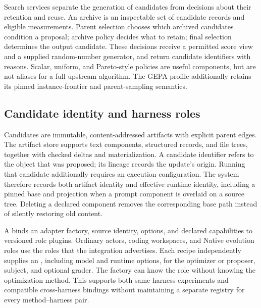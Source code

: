 Search services separate the generation of candidates from decisions about their retention and reuse. An archive is an inspectable set of candidate records and eligible measurements. Parent selection chooses which archived candidates condition a proposal; archive policy decides what to retain; final selection determines the output candidate. These decisions receive a permitted score view and a supplied random-number generator, and return candidate identifiers with reasons. Scalar, uniform, and Pareto-style policies are useful components, but are not aliases for a full upstream algorithm. The GEPA profile additionally retains its pinned instance-frontier and parent-sampling semantics.

\subsection{Candidate identity and harness roles}
Candidates are immutable, content-addressed artifacts with explicit parent edges. The artifact store supports text components, structured records, and file trees, together with checked deltas and materialization. A candidate identifier refers to the object that was proposed; its lineage records the update's origin. Running that candidate additionally requires an execution configuration. The system therefore records both artifact identity and effective runtime identity, including a pinned base and projection when a prompt component is overlaid on a source tree. Deleting a declared component removes the corresponding base path instead of silently restoring old content.

A  binds an adapter factory, source identity, options, and declared capabilities to versioned role plugins. Ordinary actors, coding workspaces, and Native evolution roles use the roles that the integration advertises. Each recipe independently supplies an , including model and runtime options, for the optimizer or proposer, subject, and optional grader. The factory can know the role without knowing the optimization method. This supports both same-harness experiments and compatible cross-harness bindings without maintaining a separate registry for every method--harness pair.

